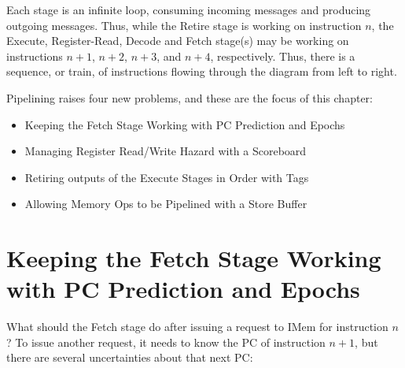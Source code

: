 Each stage is an infinite loop, consuming incoming messages and
producing outgoing messages.  Thus, while the Retire stage is working
on instruction $n$, the Execute, Register-Read, Decode and Fetch
stage(s) may be working on instructions $n+1$, $n+2$, $n+3$, and
$n+4$, respectively.  Thus, there is a sequence, or train, of
instructions flowing through the diagram from left to right.

Pipelining raises four new problems, and these are the focus of this
chapter:

\begin{itemize}

  \item Keeping the Fetch Stage Working with PC Prediction and Epochs

  \item Managing Register Read/Write Hazard with a Scoreboard

  \item Retiring outputs of the Execute Stages in Order with Tags

  \item Allowing Memory Ops to be Pipelined with a Store Buffer

\end{itemize}


\section{Keeping the Fetch Stage Working with PC Prediction and Epochs}

\label{Sec_Epochs}

What should the Fetch stage do after issuing a request to IMem for
instruction $n$?  To issue another request, it needs to know the PC of
instruction $n+1$, but there are several uncertainties about that next
PC:

